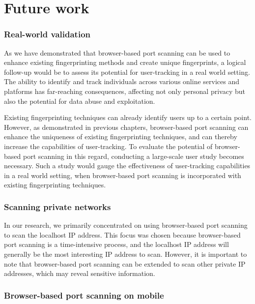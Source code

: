\clearpage


\section{Future work}

\subsubsection{Real-world validation}

As we have demonstrated that browser-based port scanning can be used to enhance existing fingerprinting methods and create unique fingerprints, a logical follow-up would be to assess its potential for user-tracking in a real world setting.
The ability to identify and track individuals across various online services and platforms has far-reaching consequences, affecting not only personal privacy but also the potential for data abuse and exploitation.

Existing fingerprinting techniques can already identify users up to a certain point. However, as demonstrated in previous chapters, browser-based port scanning can enhance the uniqueness of existing fingerprinting techniques, and can thereby increase the capabilities of user-tracking.
To evaluate the potential of browser-based port scanning in this regard, conducting a large-scale user study becomes necessary. Such a study would gauge the effectiveness of user-tracking capabilities in a real world setting, when browser-based port scanning is incorporated with existing fingerprinting techniques.

\subsubsection{Scanning private networks}

In our research, we primarily concentrated on using browser-based port scanning to scan the localhost IP address. This focus was chosen because browser-based port scanning is a time-intensive process, and the localhost IP address will generally be the most interesting IP address to scan. However, it is important to note that browser-based port scanning can be extended to scan other private IP addresses, which may reveal sensitive information.

\subsubsection{Browser-based port scanning on mobile}

